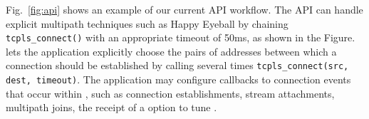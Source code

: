 Fig.~\ref{fig:api} shows an example of our current API workflow. The API can
handle explicit multipath techniques such as Happy Eyeball by chaining \texttt{tcpls\_connect()} with an appropriate timeout of 50ms, as shown in the
Figure. \tcpls lets the application explicitly choose the pairs of addresses
between which a \tcp connection should be established by calling several times \texttt{tcpls\_connect(src, dest, timeout)}. The application may configure callbacks to connection events that occur within \tcpls, such as connection establishments, stream attachments, multipath joins, the receipt of a \tcp option to tune \tcp.







